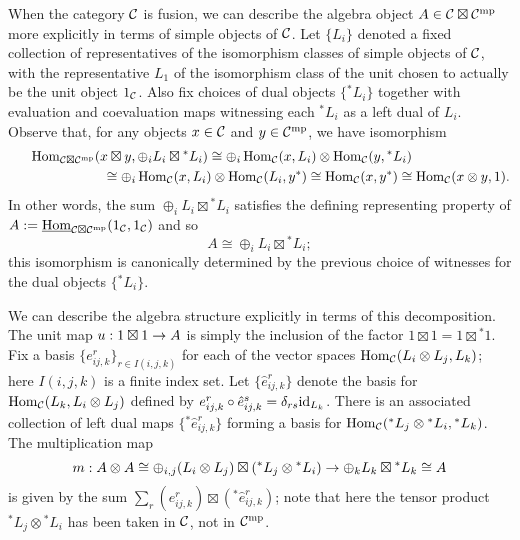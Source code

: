 \documentclass{amsart}
\begin{document}

When the category $\mathcal C$ is fusion, we can describe the algebra object $A \in \mathcal C \boxtimes \mathcal C^{\mathrm{mp}}$ more explicitly in terms of simple objects of $\mathcal C$.  Let $\{L_i\}$ denoted a fixed collection of representatives of the isomorphism classes of simple objects of $\mathcal C$, with the representative $L_1$ of the isomorphism class of the unit chosen to actually be the unit object $1_\mathcal C$.  Also fix choices of dual objects $\{{}^* L_i\}$ together with evaluation and coevaluation maps witnessing each ${}^* L_i$ as a left dual of $L_i$.  Observe that, for any objects $x \in \mathcal C$ and $y \in \mathcal C^{\mathrm{mp}}$, we have isomorphism
\[
\begin{split}
\operatorname{Hom}_{\mathcal C \boxtimes \mathcal C^{\mathrm{mp}}}( x \boxtimes y , \oplus_i L_i \boxtimes {}^* L_i)
\cong
\oplus_i \operatorname{Hom}_{\mathcal C}(x, L_i) \otimes \operatorname{Hom}_{\mathcal C}(y, {}^*L_i) \hspace*{1in}\\\hspace*{1in}
\cong
\oplus_i \operatorname{Hom}_{\mathcal C}(x, L_i) \otimes \operatorname{Hom}_{\mathcal C}(L_i, y^*)
\cong
\operatorname{Hom}_{\mathcal C}(x, y^*)
\cong
\operatorname{Hom}_{\mathcal C}(x \otimes y, 1).
\end{split}
\]
In other words, the sum $\oplus_i L_i \boxtimes {}^* L_i$ satisfies the defining representing property of $A := \operatorname{\underline{Hom}}_{\mathcal C \boxtimes \mathcal C^{\mathrm{mp}}}(1_\mathcal C,1_\mathcal C)$ and so
\[
A \cong \oplus_i L_i \boxtimes {}^* L_i;
\]
this isomorphism is canonically determined by the previous choice of witnesses for the dual objects $\{{}^* L_i\}$.

We can describe the algebra structure explicitly in terms of this decomposition.  The unit map $u: 1 \boxtimes 1 \rightarrow A$ is simply the inclusion of the factor $1 \boxtimes 1 = 1 \boxtimes {}^*1$.    Fix a basis $\{e^r_{ij,k}\}_{r \in I(i,j,k)}$ for each of the vector spaces $\operatorname{Hom}_\mathcal C(L_i \otimes L_j,L_k)$; here $I(i,j,k)$ is a finite index set.  Let $\{\hat{e}^r_{ij,k}\}$ denote the basis for $\operatorname{Hom}_\mathcal C(L_k,L_i \otimes L_j)$ defined by $e^r_{ij,k} \circ \hat{e}^s_{ij,k} = \delta_{rs} \mathrm{id}_{L_k}$.  There is an associated collection of left dual maps $\{{}^*\hat{e}^r_{ij,k}\}$ forming a basis for $\operatorname{Hom}_\mathcal C({}^* L_j \otimes {}^* L_i, {}^* L_k)$.  The multiplication map
\[
m: A \otimes A \cong \oplus_{i,j} (L_i \otimes L_j) \boxtimes ({}^* L_j \otimes {}^* L_i) \rightarrow \oplus_k L_k \boxtimes {}^* L_k \cong A
\]
is given by the sum $\sum_r (e^r_{ij,k}) \boxtimes ({}^*\hat{e}^r_{ij,k})$; note that here the tensor product ${}^* L_j \otimes {}^* L_i$ has been taken in $\mathcal C$, not in $\mathcal C^{\mathrm{mp}}$.
\end{document}
